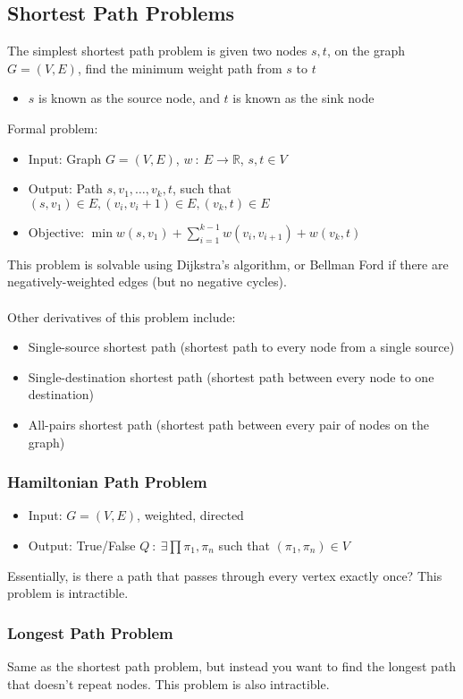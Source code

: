 \documentclass[10pt]{article}
\begin{document}
\subsection*{Shortest Path Problems}
The simplest shortest path problem is given two nodes $s, t$, on the graph $G = (V, E)$, find the minimum weight path from $s$ to $t$
\begin{itemize}
    \item $s$ is known as the source node, and $t$ is known as the sink node
\end{itemize}
Formal problem:
\begin{itemize}
    \item Input: Graph $G = (V, E)$, $w \::\: E \rightarrow \mathbb{R}$, $s, t \in V$
    \item Output: Path $s, v_1, \dots, v_k, t$, such that $(s, v_1) \in E, (v_i, v_i + 1) \in E, (v_k, t) \in E$
    \item Objective: $\min w(s, v_1) + \sum_{i = 1}^{k - 1} w(v_i, v_{i + 1}) + w(v_k, t)$
\end{itemize}
This problem is solvable using Dijkstra's algorithm, or Bellman Ford if there are negatively-weighted edges (but no negative cycles).\\\\
Other derivatives of this problem include:
\begin{itemize}
    \item Single-source shortest path (shortest path to every node from a single source)
    \item Single-destination shortest path (shortest path between every node to one destination)
    \item All-pairs shortest path (shortest path between every pair of nodes on the graph)
\end{itemize}

\subsubsection*{Hamiltonian Path Problem}
\begin{itemize}
    \item Input: $G = (V, E)$, weighted, directed
    \item Output: True/False $Q \::\: \exists \prod \pi_1, \pi_n$ such that $(\pi_1, \pi_n) \in V$
\end{itemize}
Essentially, is there a path that passes through every vertex exactly once?  This problem is intractible.

\subsubsection*{Longest Path Problem}
Same as the shortest path problem, but instead you want to find the longest path that doesn't repeat nodes.  This problem is also intractible.
\end{document}
